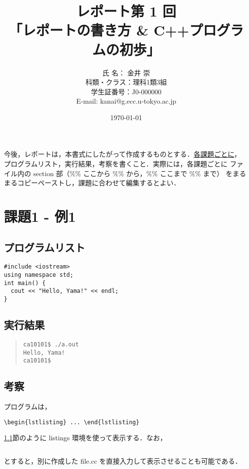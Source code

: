 \documentclass[fontsize=11pt, jafontsize=11pt, paper=a4paper, dvipdfmx]{jlreq}
\title{レポート第 1 回 \\
  「レポートの書き方 \&{} C++プログラムの初歩」}
\author{氏 名： 金井 崇 \\
        科類・クラス：理科1類3組 \\
        学生証番号：J0-000000 \\
        E-mail: kanai@g.ecc.u-tokyo.ac.jp}
\date{\today}
\begin{document}
\maketitle
%
今後，レポートは，本書式にしたがって作成するものとする．\underline{各課題ごとに}，
プログラムリスト，実行結果，考察を書くこと．実際には，各課題ごとに
ファイル内の section 部（\%\% ここから \%\% から，\%\% ここまで \%\% まで）
をまるまるコピーペーストし，課題に合わせて編集するとよい．


\section{課題1 - 例1}
\subsection{プログラムリスト}
\label{sec:prog-list1}

\begin{lstlisting}
#include <iostream>
using namespace std;
int main() {
  cout << "Hello, Yama!" << endl;
}
\end{lstlisting}

%
\subsection{実行結果}
\label{sec:results1}

\begin{quote}           %
\begin{verbatim}
ca10101$ ./a.out
Hello, Yama!
ca10101$
\end{verbatim}
\end{quote}
%
\subsection{考察}
プログラムは，
\begin{verbatim}
\begin{lstlisting} ... \end{lstlisting}
\end{verbatim}
\ref{sec:prog-list1}節のように listings 環境を使って表示する．なお，
\begin{verbatim}

\end{verbatim}
とすると，別に作成した file.cc を直接入力して表示させることも可能である．
\end{document}
